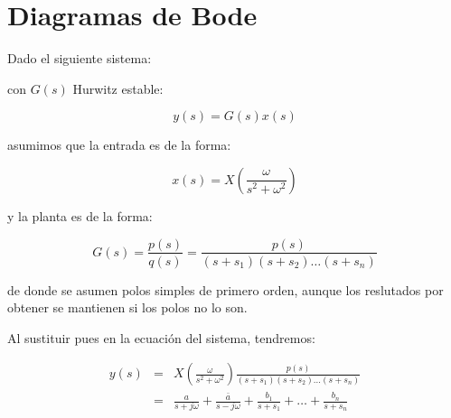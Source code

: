 
\chapter{Diagramas de Bode}

    Dado el siguiente sistema:

    \begin{figure}
        \centering
    \end{figure}

    con $G(s)$ Hurwitz estable:

    \begin{equation*}
        y(s) = G(s) x(s)
    \end{equation*}

    asumimos que la entrada es de la forma:

    \begin{equation*}
        x(s) = X \left( \frac{\omega}{s^2 + \omega^2} \right)
    \end{equation*}

    y la planta es de la forma:

    \begin{equation*}
        G(s) = \frac{p(s)}{q(s)} = \frac{p(s)}{(s + s_1) (s + s_2) \dots (s + s_n)}
    \end{equation*}

    de donde se asumen polos simples de primero orden, aunque los reslutados por obtener se mantienen si los polos no lo son.

    Al sustituir pues en la ecuación del sistema, tendremos:

    \begin{eqnarray*}
        y(s) & = & X \left( \frac{\omega}{s^2 + \omega^2} \right) \frac{p(s)}{(s + s_1) (s + s_2) \dots (s + s_n)} \\
        & = & \frac{a}{s + j \omega} + \frac{\bar{a}}{s - j \omega} + \frac{b_1}{s + s_1} + \dots + \frac{b_n}{s + s_n}
    \end{eqnarray*}

